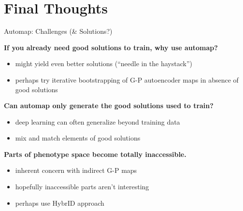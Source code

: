\section{Final Thoughts}

\begin{frame}{Automap: Challenges (\& Solutions?)}

\textbf{If you already need good solutions to train, why use automap?}
\pause
\vspace{-1ex}
\begin{itemize}[<+->]
\itemsep0em
\item might yield even better solutions (``needle in the haystack'')
\item perhaps try iterative bootstrapping of G-P autoencoder maps in absence of good solutions
\end{itemize}
\vspace{-1ex}
\pause
\textbf{Can automap only generate the good solutions used to train?}
\pause
\vspace{-1ex}
\begin{itemize}[<+->]
\itemsep0em
\item deep learning can often generalize beyond training data
\item mix and match elements of good solutions
\end{itemize}
\pause
\textbf{Parts of phenotype space become totally inaccessible.}
\pause
\vspace{-1ex}
\begin{itemize}[<+->]
\itemsep0em
\item inherent concern with indirect G-P maps \cite{clune2008generative}
\item hopefully inaccessible parts aren't interesting
\item perhaps use HybrID approach \cite{clune2009hybrid}
\end{itemize}
\vspace{-1ex}
\end{frame}

